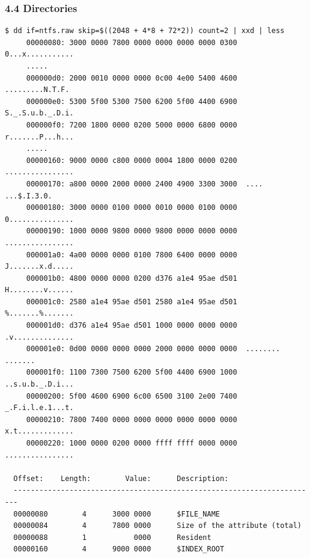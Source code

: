 \begin{frame}[fragile]
  \frametitle{4.4 Directories}
  \begin{lstlisting}[basicstyle=\tiny]
$ dd if=ntfs.raw skip=$((2048 + 4*8 + 72*2)) count=2 | xxd | less
     00000080: 3000 0000 7800 0000 0000 0000 0000 0300  0...x...........
     .....
     000000d0: 2000 0010 0000 0000 0c00 4e00 5400 4600   .........N.T.F.
     000000e0: 5300 5f00 5300 7500 6200 5f00 4400 6900  S._.S.u.b._.D.i.
     000000f0: 7200 1800 0000 0200 5000 0000 6800 0000  r.......P...h...
     .....
     00000160: 9000 0000 c800 0000 0004 1800 0000 0200  ................
     00000170: a800 0000 2000 0000 2400 4900 3300 3000  .... ...$.I.3.0.
     00000180: 3000 0000 0100 0000 0010 0000 0100 0000  0...............
     00000190: 1000 0000 9800 0000 9800 0000 0000 0000  ................
     000001a0: 4a00 0000 0000 0100 7800 6400 0000 0000  J.......x.d.....
     000001b0: 4800 0000 0000 0200 d376 a1e4 95ae d501  H........v......
     000001c0: 2580 a1e4 95ae d501 2580 a1e4 95ae d501  %.......%.......
     000001d0: d376 a1e4 95ae d501 1000 0000 0000 0000  .v..............
     000001e0: 0d00 0000 0000 0000 2000 0000 0000 0000  ........ .......
     000001f0: 1100 7300 7500 6200 5f00 4400 6900 1000  ..s.u.b._.D.i...
     00000200: 5f00 4600 6900 6c00 6500 3100 2e00 7400  _.F.i.l.e.1...t.
     00000210: 7800 7400 0000 0000 0000 0000 0000 0000  x.t.............
     00000220: 1000 0000 0200 0000 ffff ffff 0000 0000  ................

  Offset:    Length:        Value:      Description:
  -----------------------------------------------------------------------
  00000080        4      3000 0000      $FILE_NAME
  00000084        4      7800 0000      Size of the attribute (total)
  00000088        1           0000      Resident
  00000160        4      9000 0000      $INDEX_ROOT
  \end{lstlisting}
\end{frame}



